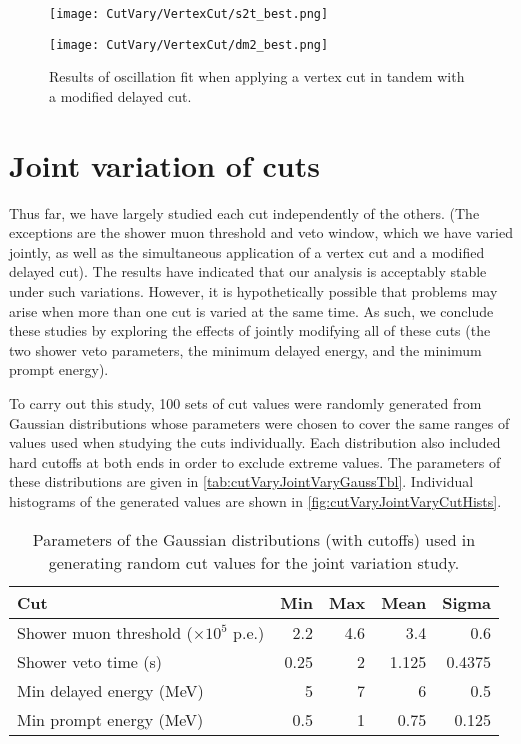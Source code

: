 \documentclass[../thesis.tex]{subfiles}
\begin{document}
\begin{figure}[ht]
  \begin{minipage}{0.47\linewidth}%
    \texttt{[image: CutVary/VertexCut/s2t\_best.png]}%
  \end{minipage}%
  \begin{minipage}{0.47\linewidth}%
    \texttt{[image: CutVary/VertexCut/dm2\_best.png]}%
  \end{minipage}%
  \caption{Results of oscillation fit when applying a vertex cut in tandem with a modified delayed cut.}
  \label{fig:cutVaryVtxCutWithDelayed}
\end{figure}

\section{Joint variation of cuts}
\label{sec:cutVaryJoint}

Thus far, we have largely studied each cut independently of the others. (The exceptions are the shower muon threshold and veto window, which we have varied jointly, as well as the simultaneous application of a vertex cut and a modified delayed cut). The results have indicated that our analysis is acceptably stable under such variations. However, it is hypothetically possible that problems may arise when more than one cut is varied at the same time. As such, we conclude these studies by exploring the effects of jointly modifying all of these cuts (the two shower veto parameters, the minimum delayed energy, and the minimum prompt energy). 

To carry out this study, 100 sets of cut values were randomly generated from Gaussian distributions whose parameters were chosen to cover the same ranges of values used when studying the cuts individually. Each distribution also included hard cutoffs at both ends in order to exclude extreme values. The parameters of these distributions are given in \autoref{tab:cutVaryJointVaryGaussTbl}. Individual histograms of the generated values are shown in \autoref{fig:cutVaryJointVaryCutHists}.

\begin{table}[ht]
  \begin{tabular}{lrrrr}
    \toprule
    Cut & Min & Max & Mean & Sigma \\
    \midrule
    Shower muon threshold ($\times 10^5$ p.e.) & 2.2 & 4.6 & 3.4 & 0.6\\
    Shower veto time (s) & 0.25 & 2 & 1.125 & 0.4375\\
    Min delayed energy (MeV) & 5 & 7 & 6 & 0.5\\
    Min prompt energy (MeV) & 0.5 & 1 & 0.75 & 0.125\\
    \bottomrule
  \end{tabular}
  \caption{Parameters of the Gaussian distributions (with cutoffs) used in generating random cut values for the joint variation study.}
  \label{tab:cutVaryJointVaryGaussTbl}
\end{table}
\end{document}
